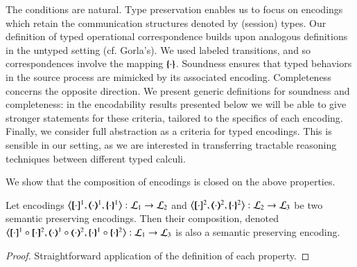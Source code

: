 The conditions are natural. Type preservation enables us to focus on encodings which retain the communication structures denoted by (session) types.
Our definition of typed operational correspondence builds upon analogous definitions in the untyped setting (cf. Gorla's).
We used labeled transitions, and so correspondences involve the mapping $\{\!\!\{\cdot\}\!\!\}$.
Soundness ensures that typed behaviors in the source process are mimicked 
by its associated encoding. Completeness concerns the opposite direction.
We present generic definitions for soundness and completeness: in the encodability results presented below
we will be able to give stronger statements for these criteria, tailored to the specifics of each encoding.
Finally, we consider full abstraction as a criteria for typed encodings. This is sensible in our setting, as we are interested in transferring tractable reasoning techniques between different typed calculi.



We show that the composition of encodings is closed on the above properties.

\begin{proposition}\rm
	Let encodings 
	$\enco{\map{\cdot}^{1}, \mapt{\cdot}^{1}, \mapa{\cdot}^{1}}: \tyl{L}_1 \to \tyl{L}_2$
	and 
	$\enco{\map{\cdot}^{2}, \mapt{\cdot}^{2}, \mapa{\cdot}^{2}}: \tyl{L}_2 \to \tyl{L}_3$
	be two semantic preserving encodings.
	Then their composition, denoted 
	$\enco{\map{\cdot}^{1} \circ \map{\cdot}^{2}, \mapt{\cdot}^{1} \circ \mapt{\cdot}^{2}, \mapa{\cdot}^{1}\circ \mapa{\cdot}^{2}}: \tyl{L}_1 \to \tyl{L}_3$
	is also a semantic preserving encoding.
\end{proposition}

\begin{proof}
	Straightforward application of the definition of each property.
\end{proof}


